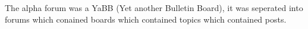 The alpha forum was a YaBB (Yet another Bulletin Board), it was seperated into forums which conained boards which contained topics which contained posts.







